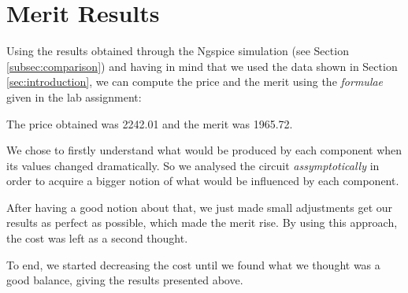 \section{Merit Results}
\label{sec:merit}

Using the results obtained through the Ngspice simulation (see Section \ref{subsec:comparison}) and having in mind that we used the data shown in Section \ref{sec:introduction}, we can compute the price and the merit using the \textit{formulae} given in the lab assignment:

The price obtained was 2242.01 and the merit was 1965.72.

We chose to firstly understand what would be produced by each component when its values changed dramatically. So we analysed the circuit \textit{assymptotically} in order to acquire a bigger notion of what would be influenced by each component.

After having a good notion about that, we just made small adjustments get our results as perfect as possible, which made the merit rise. By using this approach, the cost was left as a second thought.

To end, we started decreasing the cost until we found what we thought was a good balance, giving the results presented above.



